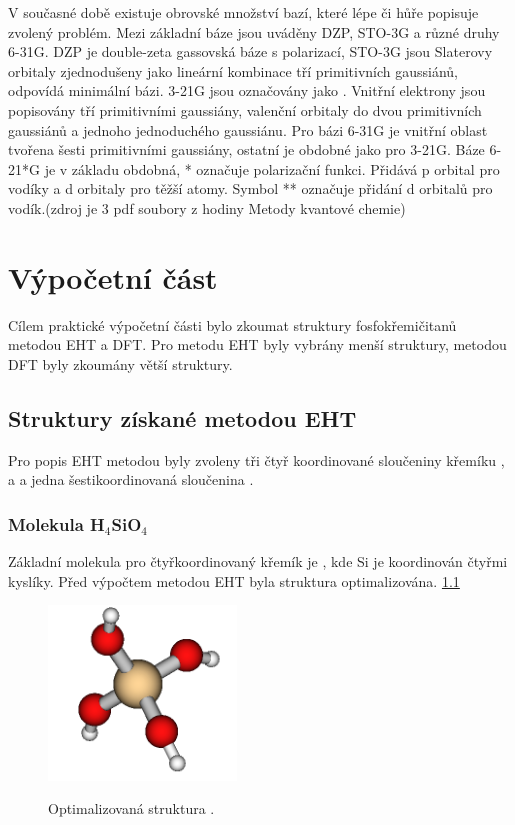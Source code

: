 \documentclass[
  digital, %
  table,   %
  lof,     %
  lot,     %
]{fithesis3}
\begin{document}
 V současné době existuje obrovské množství bazí, které lépe či hůře popisuje zvolený problém. Mezi základní báze jsou uváděny DZP, STO-3G a různé druhy 6-31G. DZP je double-zeta gassovská báze s polarizací, STO-3G jsou Slaterovy orbitaly zjednodušeny jako lineární kombinace tří primitivních gaussiánů, odpovídá minimální bázi. 3-21G jsou označovány jako . Vnitřní elektrony jsou popisovány tří primitivními gaussiány, valenční orbitaly  do dvou primitivních gaussiánů a jednoho jednoduchého gaussiánu. Pro bázi 6-31G je vnitřní oblast tvořena šesti primitivními gaussiány, ostatní je obdobné jako pro 3-21G. Báze 6-21*G je v základu obdobná, * označuje polarizační funkci. Přidává p orbital pro vodíky a d orbitaly pro těžší atomy. Symbol ** označuje přidání d orbitalů pro vodík.(zdroj je 3 pdf soubory z hodiny Metody kvantové chemie) 



\chapter{Výpočetní část}
Cílem praktické výpočetní části bylo zkoumat struktury fosfokřemičitanů metodou EHT a DFT. Pro metodu EHT byly vybrány menší struktury, metodou DFT byly zkoumány větší struktury.
\section{Struktury získané metodou EHT}
Pro popis EHT metodou byly zvoleny tři čtyř koordinované sloučeniny křemíku ,  a  a jedna šestikoordinovaná sloučenina .
\subsection{Molekula H$_4$SiO$_4$}
Základní molekula pro čtyřkoordinovaný křemík je , kde Si je koordinován čtyřmi kyslíky. Před výpočtem metodou EHT byla struktura optimalizována. \ref{obr_h4sio4_opt_struktura}

\begin{figure}[h!]
\caption{Optimalizovaná struktura . }
  \center
  \includegraphics[width=5cm]{h4sio4_obr.png}
  \label{obr_h4sio4_opt_struktura}
  \end{figure}
  
\end{document}
